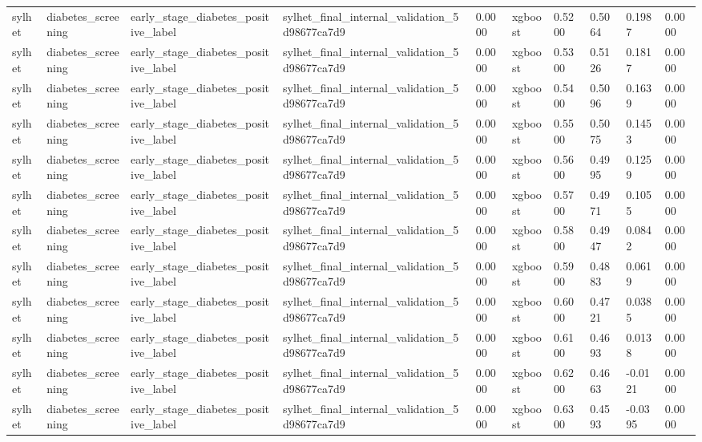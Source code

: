 \begin{tabular}{llllllllll}
sylhet & diabetes\_screening & early\_stage\_diabetes\_positive\_label & sylhet\_final\_internal\_validation\_5d98677ca7d9 & 0.0000 & xgboost & 0.5200 & 0.5064 & 0.1987 & 0.0000 \\
sylhet & diabetes\_screening & early\_stage\_diabetes\_positive\_label & sylhet\_final\_internal\_validation\_5d98677ca7d9 & 0.0000 & xgboost & 0.5300 & 0.5126 & 0.1817 & 0.0000 \\
sylhet & diabetes\_screening & early\_stage\_diabetes\_positive\_label & sylhet\_final\_internal\_validation\_5d98677ca7d9 & 0.0000 & xgboost & 0.5400 & 0.5096 & 0.1639 & 0.0000 \\
sylhet & diabetes\_screening & early\_stage\_diabetes\_positive\_label & sylhet\_final\_internal\_validation\_5d98677ca7d9 & 0.0000 & xgboost & 0.5500 & 0.5075 & 0.1453 & 0.0000 \\
sylhet & diabetes\_screening & early\_stage\_diabetes\_positive\_label & sylhet\_final\_internal\_validation\_5d98677ca7d9 & 0.0000 & xgboost & 0.5600 & 0.4995 & 0.1259 & 0.0000 \\
sylhet & diabetes\_screening & early\_stage\_diabetes\_positive\_label & sylhet\_final\_internal\_validation\_5d98677ca7d9 & 0.0000 & xgboost & 0.5700 & 0.4971 & 0.1055 & 0.0000 \\
sylhet & diabetes\_screening & early\_stage\_diabetes\_positive\_label & sylhet\_final\_internal\_validation\_5d98677ca7d9 & 0.0000 & xgboost & 0.5800 & 0.4947 & 0.0842 & 0.0000 \\
sylhet & diabetes\_screening & early\_stage\_diabetes\_positive\_label & sylhet\_final\_internal\_validation\_5d98677ca7d9 & 0.0000 & xgboost & 0.5900 & 0.4883 & 0.0619 & 0.0000 \\
sylhet & diabetes\_screening & early\_stage\_diabetes\_positive\_label & sylhet\_final\_internal\_validation\_5d98677ca7d9 & 0.0000 & xgboost & 0.6000 & 0.4721 & 0.0385 & 0.0000 \\
sylhet & diabetes\_screening & early\_stage\_diabetes\_positive\_label & sylhet\_final\_internal\_validation\_5d98677ca7d9 & 0.0000 & xgboost & 0.6100 & 0.4693 & 0.0138 & 0.0000 \\
sylhet & diabetes\_screening & early\_stage\_diabetes\_positive\_label & sylhet\_final\_internal\_validation\_5d98677ca7d9 & 0.0000 & xgboost & 0.6200 & 0.4663 & -0.0121 & 0.0000 \\
sylhet & diabetes\_screening & early\_stage\_diabetes\_positive\_label & sylhet\_final\_internal\_validation\_5d98677ca7d9 & 0.0000 & xgboost & 0.6300 & 0.4593 & -0.0395 & 0.0000 \\

\end{tabular}
